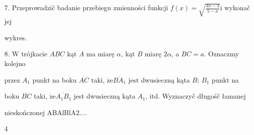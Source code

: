 \documentclass[a4paper,12pt]{article}
\begin{document}
7. Przeprowadzič badanie przebiegu zmienności funkcji $f(x) = \sqrt{\frac{3x-3}{5-x}}\mathrm{i}$ wykonač jej

wykres.

8. $\mathrm{W}$ trójkacie $ABC$ kąt $A$ ma miarę $\alpha$, kąt $B$ miarę $ 2\alpha$, a $BC=a$. Oznaczmy kolejno

przez $A_{1}$ punkt na boku $\overline{AC}$ taki, $\dot{\mathrm{z}}\mathrm{e}\overline{BA_{1}}$ jest dwusieczną kąta $B$; $B_{1}$ punkt na

boku $\overline{BC}$ taki, $\dot{\mathrm{z}}\mathrm{e}\overline{A_{1}B_{1}}$ jest dwusieczną kąta $A_{1}$, itd. Wyznaczyč długośč łamanej

nieskończonej ABAlBlA2$\ldots.$

4
\end{document}

